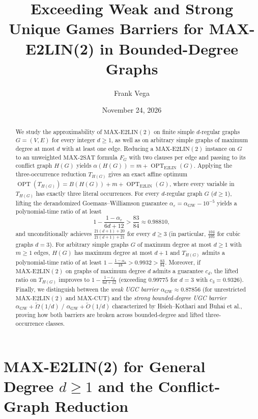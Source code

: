 \documentclass[11pt]{amsart}
\title[Exceeding Weak and Strong UGC Barriers for MAX-E2LIN(2)]{Exceeding Weak and Strong Unique Games Barriers for MAX-E2LIN(2) in Bounded-Degree Graphs}
\author{Frank Vega}
\date{November 24, 2026}
\begin{document}
\begin{abstract}
We study the approximability of $\mathrm{MAX\text{-}E2LIN}(2)$ on finite simple $d$-regular graphs $G=(V,E)$ for every integer $d \ge 1$, as well as on arbitrary simple graphs of maximum degree at most $d$ with at least one edge. Reducing a $\mathrm{MAX\text{-}E2LIN}(2)$ instance on $G$ to an unweighted $\mathrm{MAX\text{-}2SAT}$ formula $F_G$ with two clauses per edge and passing to its conflict graph $H(G)$ yields $\alpha(H(G)) = m + \operatorname{OPT}_{\mathrm{E2LIN}}(G)$. Applying the three-occurrence reduction $T_{H(G)}$ gives an exact affine optimum $\operatorname{OPT}(T_{H(G)}) = B(H(G)) + m + \operatorname{OPT}_{\mathrm{E2LIN}}(G)$, where every variable in $T_{H(G)}$ has exactly three literal occurrences. For every $d$-regular graph $G$ ($d \ge 1$), lifting the derandomized Goemans--Williamson guarantee $\alpha_\varepsilon = \alpha_{\mathrm{GW}} - 10^{-5}$ yields a polynomial-time ratio of at least
\[
1 - \frac{1-\alpha_\varepsilon}{6d+12} > \frac{83}{84} \approx 0.98810,
\]
and unconditionally achieves $\frac{21(d+1)+20}{21(d+1)+21}$ for every $d \ge 3$ (in particular, $\frac{104}{105}$ for cubic graphs $d=3$). For arbitrary simple graphs $G$ of maximum degree at most $d \ge 1$ with $m \ge 1$ edges, $H(G)$ has maximum degree at most $d+1$ and $T_{H(G)}$ admits a polynomial-time ratio of at least $1 - \frac{1-\alpha_\varepsilon}{18} > 0.9932 > \frac{83}{84}$. Moreover, if $\mathrm{MAX\text{-}E2LIN}(2)$ on graphs of maximum degree $d$ admits a guarantee $c_d$, the lifted ratio on $T_{H(G)}$ improves to $1 - \frac{1-c_d}{6d+12}$ (exceeding $0.99775$ for $d=3$ with $c_3 = 0.9326$). Finally, we distinguish between the \emph{weak UGC barrier} $\alpha_{\mathrm{GW}} \approx 0.87856$ (for unrestricted $\mathrm{MAX\text{-}E2LIN}(2)$ and $\mathrm{MAX\text{-}CUT}$) and the \emph{strong bounded-degree UGC barrier} $\alpha_{\mathrm{GW}} + \widetilde{\Omega}(1/d)$ / $\alpha_{\mathrm{GW}} + \widetilde{O}(1/d)$ characterized by Hsieh--Kothari and Buhai et al., proving how both barriers are broken across bounded-degree and lifted three-occurrence classes.
\end{abstract}

\maketitle

\section{MAX-E2LIN(2) for General Degree $d \ge 1$ and the Conflict-Graph Reduction}
\end{document}

